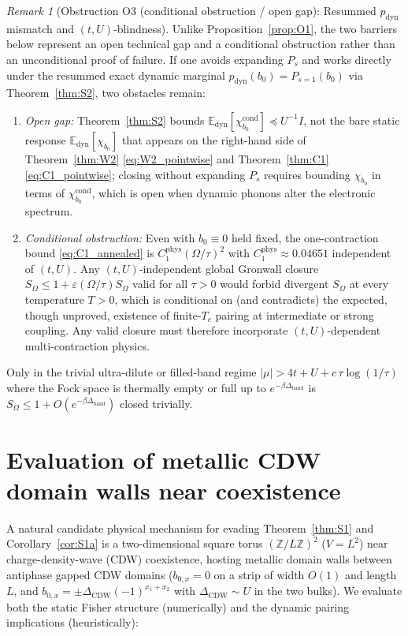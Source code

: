 \documentclass[11pt]{article}
\theoremstyle{definition}
\theoremstyle{remark}
\newtheorem{remark}[theorem]{Remark}
\DeclareMathOperator{\cond}{cond}
\DeclareMathOperator{\dyn}{dyn}
\DeclareMathOperator{\phys}{phys}
\newcommand{\E}{\mathbb{E}}
\newcommand{\Z}{\mathbb{Z}}
\begin{document}
\begin{remark}[Obstruction O3 (conditional obstruction / open gap): Resummed $p_{\dyn}$ mismatch and $(t,U)$-blindness]
\label{rem:O3}
Unlike Proposition~\ref{prop:O1}, the two barriers below represent an open technical gap and a conditional obstruction rather than an unconditional proof of failure. If one avoids expanding $P_s$ and works directly under the resummed exact dynamic marginal $p_{\dyn}(b_0) = P_{s=1}(b_0)$ via Theorem~\ref{thm:S2}, two obstacles remain:
\begin{enumerate}[label=(\arabic*),leftmargin=2.2em]
\item \emph{Open gap:} Theorem~\ref{thm:S2} bounds $\E_{\dyn}[\chi_{b_0}^{\cond}] \preceq U^{-1} I$, not the bare static response $\E_{\dyn}[\chi_{b_0}]$ that appears on the right-hand side of Theorem~\ref{thm:W2} \eqref{eq:W2_pointwise} and Theorem~\ref{thm:C1} \eqref{eq:C1_pointwise}; closing without expanding $P_s$ requires bounding $\chi_{b_0}$ in terms of $\chi_{b_0}^{\cond}$, which is open when dynamic phonons alter the electronic spectrum.
\item \emph{Conditional obstruction:} Even with $b_0 \equiv 0$ held fixed, the one-contraction bound \eqref{eq:C1_annealed} is $C_1^{\phys}(\Omega/\tau)^2$ with $C_1^{\phys} \approx 0.04651$ independent of $(t,U)$. Any $(t,U)$-independent global Gronwall closure $S_\Omega \le 1 + \varepsilon(\Omega/\tau) S_\Omega$ valid for all $\tau > 0$ would forbid divergent $S_\Omega$ at every temperature $T > 0$, which is conditional on (and contradicts) the expected, though unproved, existence of finite-$T_c$ pairing at intermediate or strong coupling. Any valid closure must therefore incorporate $(t,U)$-dependent multi-contraction physics.
\end{enumerate}
Only in the trivial ultra-dilute or filled-band regime $|\mu| > 4t + U + c\,\tau\log(1/\tau)$ where the Fock space is thermally empty or full up to $e^{-\beta\Delta_{\mathrm{band}}}$ is $S_\Omega \le 1 + O(e^{-\beta\Delta_{\mathrm{band}}})$ closed trivially.
\end{remark}

\section{Evaluation of metallic CDW domain walls near coexistence}
\label{sec:domainwall}

A natural candidate physical mechanism for evading Theorem~\ref{thm:S1} and Corollary~\ref{cor:S1a} is a two-dimensional square torus $(\Z/L\Z)^2$ ($V = L^2$) near charge-density-wave (CDW) coexistence, hosting metallic domain walls between antiphase gapped CDW domains ($b_{0,x} = 0$ on a strip of width $O(1)$ and length $L$, and $b_{0,x} = \pm \Delta_{\mathrm{CDW}} (-1)^{x_1+x_2}$ with $\Delta_{\mathrm{CDW}} \sim U$ in the two bulks). We evaluate both the static Fisher structure (numerically) and the dynamic pairing implications (heuristically):
\end{document}
